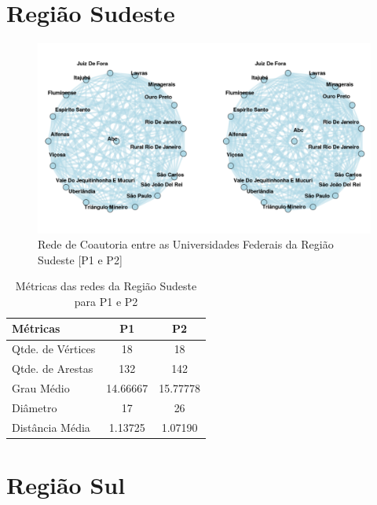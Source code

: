 \documentclass[12pt]{article}
\begin{document}
\section{Região Sudeste}

\begin{figure}[H]
\centering
\includegraphics[scale=0.6]{images/sudeste.pdf}
\caption{Rede de Coautoria entre as Universidades Federais da Região Sudeste [P1 e P2]}
\label{rede-sudeste}
\end{figure}


\begin{table}[H]
\centering
\begin{tabular}{lS[table-format=3.5]S[table-format=3.5]}
\hline
{} 
\textbf{Métricas} & \textbf{P1} & \textbf{P2} \\ \hline
Qtde. de Vértices & 18    & 18           \\ \hline
Qtde. de Arestas  & 132   & 142          \\ \hline
Grau Médio        & 14.66667    & 15.77778     \\ \hline
Diâmetro          & 17    & 26           \\ \hline
Distância Média   & 1.13725     & 1.07190     \\ \hline
\end{tabular}
\caption{Métricas das redes da Região Sudeste para P1 e P2}
\end{table}


\section{Região Sul}
\end{document}
